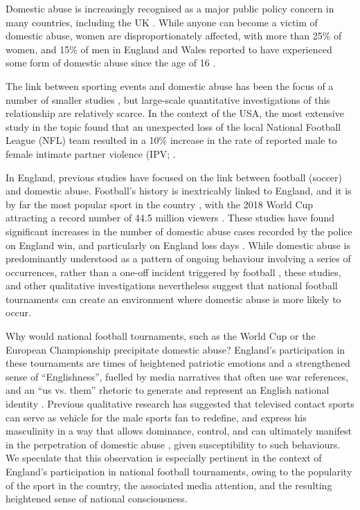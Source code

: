 \documentclass[12pt, a4paper]{article}
\begin{document}
Domestic abuse is increasingly recognised as a major public policy concern in many countries, including the UK \cite{ep}. While anyone can become a victim of domestic abuse, women are disproportionately affected, with more than 25\% of women, and 15\% of men in England and Wales reported to have experienced some form of domestic abuse since the age of 16 \cite{ONS}.

The link between sporting events and domestic abuse has been the focus of a number of smaller studies \cite{Williams2014}, but large-scale quantitative investigations of this relationship are relatively scarce. In the context of the USA, the most extensive study in the topic found that an unexpected loss of the local National Football League (NFL) team resulted in a 10\% increase in the rate of reported male to female intimate partner violence (IPV; .

In England, previous studies have focused on the link between football (soccer) and domestic abuse. Football's history is inextricably linked to England, and it is by far the most popular sport in the country \cite{Parry2014}, with the 2018 World Cup attracting a record number of 44.5 million viewers \cite{BBC}. These studies have found significant increases in the number of domestic abuse cases recorded by the police on England win, and particularly on England loss days \cite{Brimicombe2012, Kirby2014}. While domestic abuse is predominantly understood as a pattern of ongoing behaviour involving a series of occurrences, rather than a one-off incident triggered by football \cite{Brooks-Hay2018}, these studies, and other qualitative investigations \cite{Swallow} nevertheless suggest that national football tournaments can create an environment where domestic abuse is more likely to occur.




Why would national football tournaments, such as the World Cup or the European Championship precipitate domestic abuse? England's participation in these tournaments are times of heightened patriotic emotions and a strengthened sense of ``Englishness'', fuelled by media narratives that often use war references, and an ``us vs. them'' rhetoric to generate and represent an English national identity \cite{Vincent2014}. Previous qualitative research has suggested that televised contact sports can serve as vehicle for the male sports fan to redefine, and express his masculinity in a way that allows dominance, control, and can ultimately manifest in the perpetration of domestic abuse \cite{Sabo,Swallow}, given susceptibility to such behaviours. We speculate that this observation is especially pertinent in the context of England's participation in national football tournaments, owing to the popularity of the sport in the country, the associated media attention, and the resulting heightened sense of national consciousness. 
\end{document}
